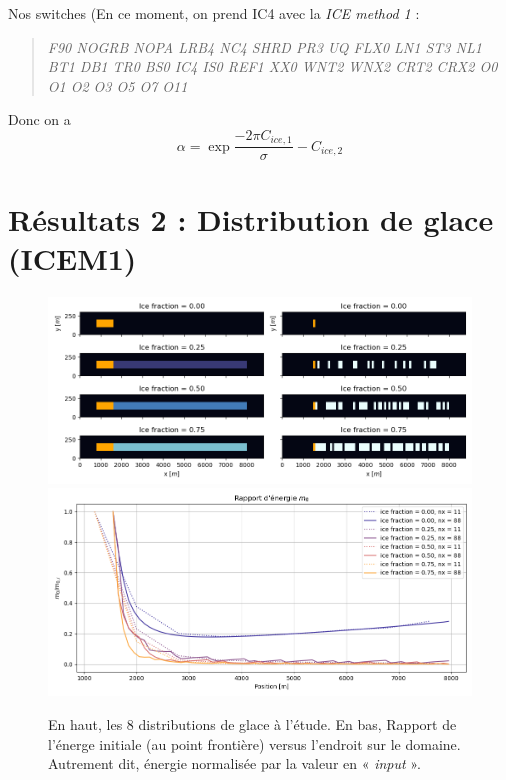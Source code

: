 \documentclass[10pt]{article}
\numberwithin{equation}{section}
\begin{document}
Nos switches (En ce moment, on prend IC4 avec la \emph{ICE method 1} : 
\begin{quote}
\emph{F90 NOGRB NOPA LRB4 NC4 SHRD PR3 UQ FLX0 LN1 ST3 NL1 BT1 DB1 TR0 BS0 IC4 IS0 REF1 XX0 WNT2 WNX2 CRT2 CRX2 O0 O1 O2 O3 O5 O7 O11}
\end{quote}
Donc on a
\begin{equation}
   \alpha = \exp{\frac{-2\pi C_{ice,1}}{\sigma} - C_{ice,2}}
\end{equation}
\section{Résultats 2 : Distribution de glace (ICEM1)}
\label{sec:org6e00a00}



\begin{figure}[!h]
\begin{center}
\begin{minipage}{\linewidth}
\begin{center}
\includegraphics[width=\linewidth]{Figures/figures/ice_distributions001.png}
\includegraphics[width=\linewidth]{Figures/figures/analyse_spec_ww3_002.png}
\end{center}
\end{minipage}
\begin{minipage}{0.8\textwidth}
\caption{En haut, les 8 distributions de glace à l'étude. En bas, Rapport de l'énerge initiale (au point frontière) versus l'endroit sur le domaine. Autrement dit, énergie normalisée par la valeur en « \textit{input} ».}
\label{fig:jonswap}
\end{minipage}
\end{center}
\end{figure}
\end{document}
